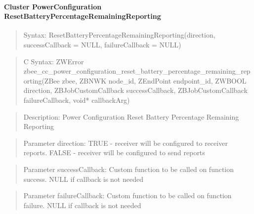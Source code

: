 \paragraph{Cluster PowerConfiguration ResetBatteryPercentageRemainingReporting}
\begin{quote}Syntax: ResetBatteryPercentageRemainingReporting(direction, successCallback = NULL, failureCallback = NULL)\end{quote}
\begin{quote}C Syntax: ZWError zbee\_cc\_power\_configuration\_reset\_battery\_percentage\_remaining\_reporting(ZBee zbee, ZBNWK node\_id, ZEndPoint endpoint\_id, ZWBOOL direction, ZBJobCustomCallback successCallback, ZBJobCustomCallback failureCallback, void* callbackArg)\end{quote}
\begin{quote}Description: Power Configuration Reset Battery Percentage Remaining Reporting\end{quote}
\begin{quote}Parameter direction: TRUE  - receiver will be configured to receiver reports. FALSE - receiver will be configured to send reports\end{quote}
\begin{quote}Parameter successCallback: Custom function to be called on function success. NULL if callback is not needed\end{quote}
\begin{quote}Parameter failureCallback: Custom function to be called on function failure. NULL if callback is not needed\end{quote}


